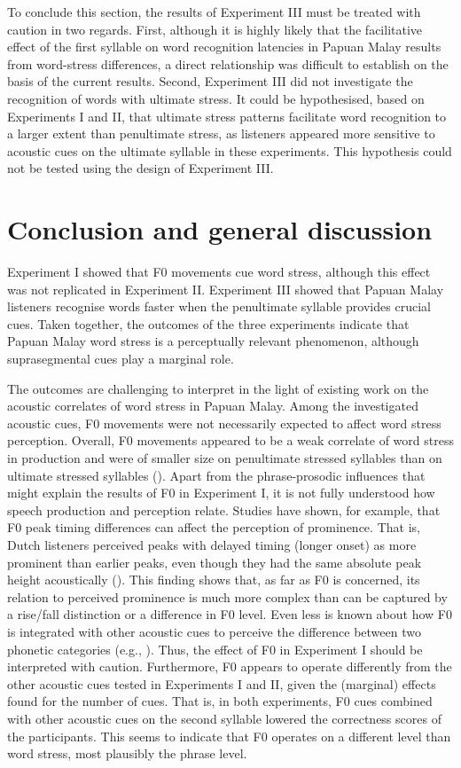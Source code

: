 To conclude this section, the results of Experiment III must be treated with caution in two regards. First, although it is highly likely that the facilitative effect of the first syllable on word recognition latencies in Papuan Malay results from word-stress differences, a direct relationship was difficult to establish on the basis of the current results. Second, Experiment III did not investigate the recognition of words with ultimate stress. It could be hypothesised, based on Experiments I and II, that ultimate stress patterns facilitate word recognition to a larger extent than penultimate stress, as listeners appeared more sensitive to acoustic cues on the ultimate syllable in these experiments. This hypothesis could not be tested using the design of Experiment III.

\section{Conclusion and general discussion} \label{sec35}
Experiment I showed that F0 movements cue word stress, although this effect was not replicated in Experiment II. Experiment III showed that Papuan Malay listeners recognise words faster when the penultimate syllable provides crucial cues. Taken together, the outcomes of the three experiments indicate that Papuan Malay word stress is a perceptually relevant phenomenon, although suprasegmental cues play a marginal role.

The outcomes are challenging to interpret in the light of existing work on the acoustic correlates of word stress in Papuan Malay. Among the investigated acoustic cues, F0 movements were not necessarily expected to affect word stress perception. Overall, F0 movements appeared to be a weak correlate of word stress in production and were of smaller size on penultimate stressed syllables than on ultimate stressed syllables (). Apart from the phrase-prosodic influences that might explain the results of F0 in Experiment I, it is not fully understood how speech production and perception relate. Studies have shown, for example, that F0 peak timing differences can affect the perception of prominence. That is, Dutch listeners perceived peaks with delayed timing (longer onset) as more prominent than earlier peaks, even though they had the same absolute peak height acoustically (\citealt{gussenhoven_perceptual_1997}). This finding shows that, as far as F0 is concerned, its relation to perceived prominence is much more complex than can be captured by a rise/fall distinction or a difference in F0 level. Even less is known about how F0 is integrated with other acoustic cues to perceive the difference between two phonetic categories (e.g., \citealt{repp_trading_1983}). Thus, the effect of F0 in Experiment I should be interpreted with caution. Furthermore, F0 appears to operate differently from the other acoustic cues tested in Experiments I and II, given the (marginal) effects found for the number of cues. That is, in both experiments, F0 cues combined with other acoustic cues on the second syllable lowered the correctness scores of the participants. This seems to indicate that F0 operates on a different level than word stress, most plausibly the phrase level.

